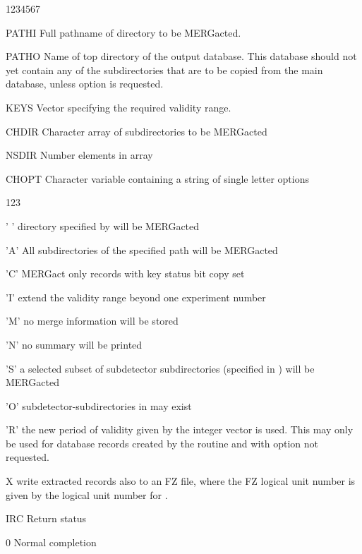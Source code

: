 \begin{DLtt}{1234567}
\item[PATHI]Full pathname of directory to be MERGacted.
\item[PATHO]Name of top directory of the output database.
  This database should not yet contain any of the
  subdirectories that are to be copied from the main database, unless
  option  is requested.
\item[KEYS]Vector specifying the required validity range.
\item[CHDIR]Character array of subdirectories to be MERGacted
\item[NSDIR]Number elements in array 
\item[CHOPT]Character variable containing a string of single letter options
  \begin{DLtt}{123}
    \item[' ']directory specified by  will be MERGacted
    \item['A']All subdirectories of the specified path will be
      MERGacted
    \item['C']MERGact only records with key status bit copy set
    \item['I']extend the validity range beyond one experiment number
    \item['M']no merge information will be stored
    \item['N']no summary will be printed
    \item['S']a selected subset of subdetector subdirectories
    (specified in ) will be MERGacted
    \item['O']subdetector-subdirectories in  may exist
    \item['R']the new period of validity given by the
      integer vector  is used. This
      may only be used for database records created by
      the  routine and with option  not requested.
    \item[X]write extracted records also to an FZ file,
      where the FZ logical unit number is given by
      the logical unit number for .
  \end{DLtt}
\item[IRC]Return status
  \begin{DLtt}{12}
    \item[0]Normal completion
  \end{DLtt}
\end{DLtt}


